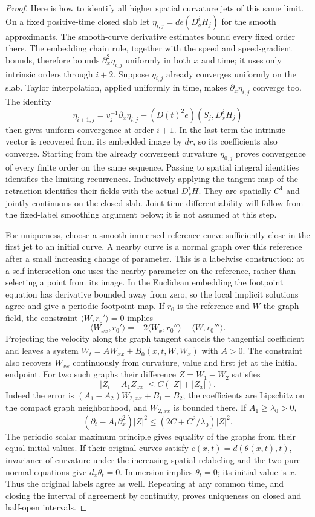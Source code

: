 \begin{proof}
Here is how to identify all higher spatial curvature jets of this
same limit.  On a fixed positive-time closed slab let
$\eta_{i,j}=de(D_s^iH_j)$ for the smooth approximants.  The
smooth-curve derivative estimates bound every fixed order there.
The embedding chain rule, together with the speed and speed-gradient
bounds, therefore bounds $\partial_x^2\eta_{i,j}$ uniformly
in both $x$ and time; it uses only intrinsic orders through $i+2$.
Suppose $\eta_{i,j}$ already converges uniformly on the slab.
Taylor interpolation, applied uniformly in time, makes
$\partial_x\eta_{i,j}$ converge too.  The identity
\[
 \eta_{i+1,j}=v_j^{-1}\partial_x\eta_{i,j}
                           -(D(t)^2e)(S_j,D_s^iH_j)
\]
then gives uniform convergence at order $i+1$.  In the last term
the intrinsic vector is recovered from its embedded image by
$dr$, so its coefficients also converge.  Starting from the
already convergent curvature $\eta_{0,j}$ proves convergence
of every finite order on the same sequence.
Passing to spatial integral identities identifies the limiting
recurrences.  Inductively applying the tangent map of the
retraction identifies their fields with the actual $D_s^iH$.
They are spatially $C^1$ and jointly continuous on the closed
slab.  Joint time differentiability will follow from the fixed-label
smoothing argument below; it is not assumed at this step.

For uniqueness, choose a smooth immersed reference curve sufficiently close
in the first jet to an initial curve.  A nearby curve is a normal graph over
this reference after a small increasing change of parameter.  This is a
labelwise construction: at a self-intersection one uses the nearby parameter
on the reference, rather than selecting a point from its image.  In the
Euclidean embedding the footpoint equation has derivative bounded away
from zero, so the local implicit solutions agree and give a periodic
footpoint map.  If $r_0$ is the reference and $W$ the graph field, the
constraint $\langle W,r_0'\rangle=0$ implies
\[
 \langle W_{xx},r_0'\rangle
       =-2\langle W_x,r_0''\rangle-\langle W,r_0'''\rangle.
\]
Projecting the velocity along the graph tangent cancels the tangential
coefficient and leaves a system $W_t=A W_{xx}+B_0(x,t,W,W_x)$ with
$A>0$.  The constraint also recovers $W_{xx}$ continuously from curvature,
value and first jet at the initial endpoint.  For two such graphs their
difference $Z=W_1-W_2$ satisfies
\[
 |Z_t-A_1Z_{xx}|\leq C(|Z|+|Z_x|).
\]
Indeed the error is $(A_1-A_2)W_{2,xx}+B_1-B_2$;
the coefficients are Lipschitz on the compact graph neighborhood,
and $W_{2,xx}$ is bounded there.  If $A_1\geq\lambda_0>0$,
\[
 (\partial_t-A_1\partial_x^2)|Z|^2
       \leq(2C+C^2/\lambda_0)|Z|^2.
\]
The periodic scalar maximum principle gives equality of the graphs
from their equal initial values.  If their original curves satisfy
$c(x,t)=d(\theta(x,t),t)$, invariance of curvature under the
increasing spatial relabeling and the two pure-normal equations give
$d_x\theta_t=0$.  Immersion implies $\theta_t=0$; its initial
value is $x$.  Thus the original labels agree as well.
Repeating at any common time, and closing the interval of agreement
by continuity, proves uniqueness on closed and half-open intervals.


\end{proof}
